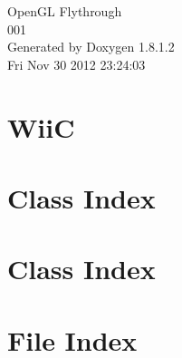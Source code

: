 \documentclass{book}
\begin{document}
\hypersetup{pageanchor=false,citecolor=blue}
\begin{titlepage}
\vspace*{7cm}
\begin{center}
{\Large Open\-G\-L Flythrough \\[1ex]\large 001 }\\
\vspace*{1cm}
{\large Generated by Doxygen 1.8.1.2}\\
\vspace*{0.5cm}
{\small Fri Nov 30 2012 23:24:03}\\
\end{center}
\end{titlepage}
\clearemptydoublepage
{}
\tableofcontents
\clearemptydoublepage
{}
\hypersetup{pageanchor=true,citecolor=blue}
\chapter{Wii\-C}
\label{index}\hypertarget{index}{}
\chapter{Class Index}

\chapter{Class Index}

\chapter{File Index}

\end{document}
